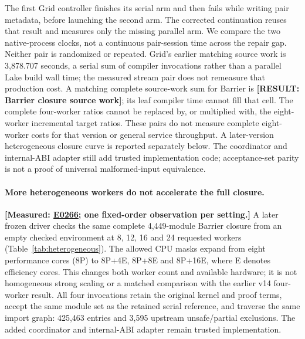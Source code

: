 \documentclass[10pt,twocolumn]{article}
\newcommand{\missing}[1]{\textbf{[RESULT: #1]}}
\newcommand{\measured}[1]{\textbf{[Measured: #1]}}
\newcommand{\expref}[2]{\href{https://github.com/yunwei37/proofserve/blob/main/docs/tmp/build-and-evaluate/step-#1/step-report.md}{E#2}}
\begin{document}
The first Grid controller finishes its serial arm and then fails while
writing pair metadata, before launching the second arm.
The corrected continuation reuses that result and measures only the
missing parallel arm. We compare the two native-process clocks, not a
continuous pair-session time across the repair gap.
Neither pair is randomized or repeated.
Grid's earlier matching source work is 3,878.707 seconds, a serial sum
of compiler invocations rather than a parallel Lake build wall time;
the measured stream pair does not remeasure that production cost.
A matching complete source-work sum for Barrier is \missing{Barrier closure
source work}; its leaf compiler time cannot fill that cell.
The complete four-worker ratios cannot be replaced by, or multiplied with,
the eight-worker incremental target ratios.
These pairs do not measure complete eight-worker costs for that version or
general service throughput. A later-version heterogeneous closure curve is
reported separately below. The coordinator and internal-ABI adapter still add
trusted implementation code; acceptance-set parity is not a proof of universal
malformed-input equivalence.

\paragraph{More heterogeneous workers do not accelerate the full closure.}
\measured{\expref{0266-20261102T083616+0000}{0266}; one fixed-order observation per setting.}
A later frozen driver checks the same complete 4,449-module Barrier closure
from an empty checked environment at 8, 12, 16 and 24 requested workers
(Table~\ref{tab:heterogeneous}).
The allowed CPU masks expand from eight performance cores (8P) to
8P+4E, 8P+8E and 8P+16E, where E denotes efficiency cores.
This changes both worker count and available hardware; it is not
homogeneous strong scaling or a matched comparison with the earlier v14
four-worker result.
All four invocations retain the original kernel and proof terms, accept the
same module set as the retained serial reference, and traverse the same
import graph: 425,463 entries and 3,595 upstream unsafe/partial exclusions.
The added coordinator and internal-ABI adapter remain trusted implementation.
\end{document}

